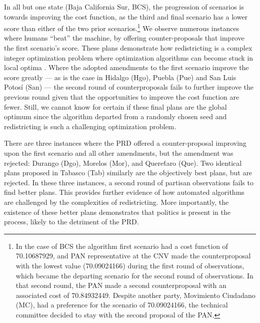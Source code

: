 \documentclass[letter,12pt]{article}
\begin{document}
In all but one state (Baja California Sur, BCS), the progression of scenarios is towards improving the cost function, as the third and final scenario has a lower score than either of the two prior scenarios.\footnote{In the case of BCS the algorithm first scenario had a cost function of 70.10687929, and PAN representative at the CNV made the counterproposal with the lowest value (70.09024166) during the first round of observations, which became the departing scenario for the second round of observations. In that second round, the PAN made a second counterproposal with an associated cost of 70.84932449. Despite another party, Movimiento Ciudadano (MC), had a preference for the scenario of 70.09024166, the technical committee decided to stay with the second proposal of the PAN.} We observe numerous instances where humans ``beat'' the machine, by offering counter-proposals that improve the first scenario's score. These plans demonstrate how redistricting is a complex integer optimization problem where optimization algorithms can become stuck in local optima \citep{altman.mcdonald2011bard}. Where the adopted amendments to the first scenario improve the score greatly --- as is the case in Hidalgo (Hgo), Puebla (Pue) and San Luis Potos\'i (San) --- the second round of counterproposals fails to further improve the previous round given that the opportunities to improve the cost function are fewer. Still, we cannot know for certain if these final plans are the global optimum since the algorithm departed from a randomly chosen seed and redistricting is such a challenging optimization problem.

There are three instances where the PRD offered a counter-proposal improving upon the first scenario and all other amendments, but the amendment was rejected: Durango (Dgo), Morelos (Mor), and Quere\'taro (Que). Two identical plans proposed in Tabasco (Tab) similarly are the objectively best plans, but are rejected. In these three instances, a second round of partisan observations fails to find better plans. This provides further evidence of how automated algorithms are challenged by the complexities of redistricting. More importantly, the existence of these better plans demonstrates that politics is present in the process, likely to the detriment of the PRD.   

\end{document}
